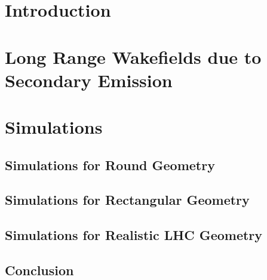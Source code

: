 \documentclass[5p]{elsarticle}%
\begin{document}
\section{Introduction}

\section{Long Range Wakefields due to Secondary Emission}


\section{Simulations}

\subsection{Simulations for Round Geometry}

\subsection{Simulations for Rectangular Geometry}

\subsection{Simulations for Realistic LHC Geometry}

\subsection{Conclusion}

\begin{thebibliography}{16}%


\end{thebibliography}%
\end{document}

